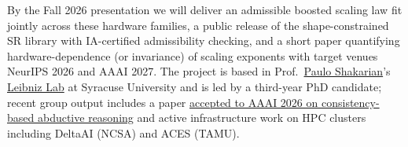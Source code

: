 \documentclass[10pt]{article}
\begin{document}
By the Fall 2026 presentation we will deliver an admissible boosted scaling law fit jointly across these hardware families, a public release of the shape-constrained SR library with IA-certified admissibility checking, and a short paper quantifying hardware-dependence (or invariance) of scaling exponents with target venues NeurIPS 2026 and AAAI 2027. The project is based in Prof.\ \href{https://ecs.syracuse.edu/faculty-staff/paulo-shakarian}{Paulo Shakarian}'s \href{https://leibniz.syracuse.edu/}{Leibniz Lab} at Syracuse University and is led by a third-year PhD candidate; recent group output includes a paper \href{https://arxiv.org/abs/2505.19361}{accepted to AAAI 2026 on consistency-based abductive reasoning} and active infrastructure work on HPC clusters including DeltaAI (NCSA) and ACES (TAMU).
\end{document}
